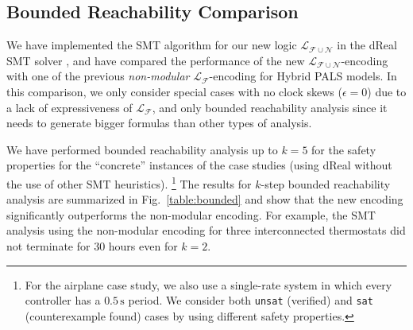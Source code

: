 \subsection{Bounded Reachability Comparison}
\label{sec:expr}

We have implemented the SMT algorithm
for our new logic $\mathcal{L}_{\mathcal{F}\cup\mathcal{N}}$ in the \textsf{dReal} SMT solver \cite{dReal},
and have compared the performance of 
the new $\mathcal{L}_{\mathcal{F}\cup\mathcal{N}}$-encoding
with one of the previous \emph{non-modular} $\mathcal{L}_{\mathcal{F}}$-encoding  for Hybrid PALS models.
%
In this comparison,
we only consider special cases %
with no clock skews ($\epsilon = 0$) 
due to a lack of expressiveness of  $\mathcal{L}_{\mathcal{F}}$,
and only bounded reachability analysis
since it needs to generate bigger formulas than other types of analysis.


We have performed bounded reachability analysis up to $k = 5$
for the safety properties for the ``concrete'' instances of the case studies
(using \textsf{dReal} without the use of other SMT heuristics).%
\footnote{For the airplane case study, we also use a single-rate system
in which every controller has a $0.5\,\mathrm{s}$ period.
We consider both \texttt{unsat} (verified) and \texttt{sat}  (counterexample found) cases
by using different safety properties.}
%
The results for $k$-step bounded reachability analysis 
are summarized  in Fig.~\ref{table:bounded} and show that
the new encoding significantly outperforms 
the non-modular encoding.
For example, 
the SMT analysis using the non-modular encoding
for three interconnected thermostats
 did not terminate for $30$ hours
even for $k = 2$.


